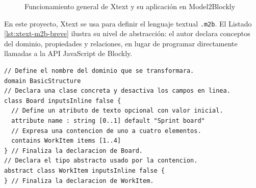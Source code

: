 \begin{figure}[htbp]
  \centering
  \caption{Funcionamiento general de Xtext y su aplicación en Model2Blockly}
  \label{fig:funcionamiento-general-xtext}
\end{figure}

En este proyecto, Xtext se usa para definir el lenguaje textual
\texttt{.m2b}. El Listado \ref{lst:xtext-m2b-breve} ilustra su nivel de
abstracción: el autor declara conceptos del dominio, propiedades y relaciones,
en lugar de programar directamente llamadas a la API JavaScript de Blockly.

\begin{lstlisting}[style=tfmm2b, caption={Ejemplo breve de una definición textual \texttt{.m2b}}, label={lst:xtext-m2b-breve}]
// Define el nombre del dominio que se transformara.
domain BasicStructure
// Declara una clase concreta y desactiva los campos en linea.
class Board inputsInline false {
  // Define un atributo de texto opcional con valor inicial.
  attribute name : string [0..1] default "Sprint board"
  // Expresa una contencion de uno a cuatro elementos.
  contains WorkItem items [1..4]
} // Finaliza la declaracion de Board.
// Declara el tipo abstracto usado por la contencion.
abstract class WorkItem inputsInline false {
} // Finaliza la declaracion de WorkItem.
\end{lstlisting}

